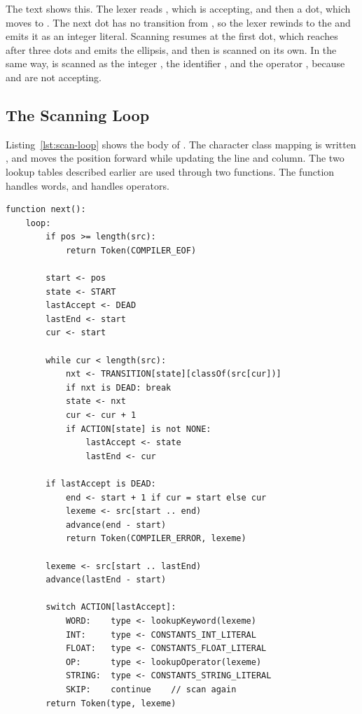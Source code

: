 The text  shows this. The lexer reads , which is accepting,
and then a dot, which moves to . The next dot has no transition
from , so the lexer rewinds to the  and emits it as an
integer literal. Scanning resumes at the first dot, which reaches
 after three dots and emits the ellipsis, and then  is
scanned on its own. In the same way,  is scanned as the integer
, the identifier , and the operator \code{+}, because
 and  are not accepting.

\subsection{The Scanning Loop}

Listing~\ref{lst:scan-loop} shows the body of . The character class
mapping is written , and  moves the position
forward while updating the line and column. The two lookup tables described
earlier are used through two functions. The function 
handles words, and  handles operators.

\begin{lstlisting}[style=pseudocode, float=tbp,
    caption={The scanning loop of the lexer.}, label=lst:scan-loop]
function next():
    loop:
        if pos >= length(src):
            return Token(COMPILER_EOF)

        start <- pos
        state <- START
        lastAccept <- DEAD
        lastEnd <- start
        cur <- start

        while cur < length(src):
            nxt <- TRANSITION[state][classOf(src[cur])]
            if nxt is DEAD: break
            state <- nxt
            cur <- cur + 1
            if ACTION[state] is not NONE:
                lastAccept <- state
                lastEnd <- cur

        if lastAccept is DEAD:
            end <- start + 1 if cur = start else cur
            lexeme <- src[start .. end)
            advance(end - start)
            return Token(COMPILER_ERROR, lexeme)

        lexeme <- src[start .. lastEnd)
        advance(lastEnd - start)

        switch ACTION[lastAccept]:
            WORD:    type <- lookupKeyword(lexeme)
            INT:     type <- CONSTANTS_INT_LITERAL
            FLOAT:   type <- CONSTANTS_FLOAT_LITERAL
            OP:      type <- lookupOperator(lexeme)
            STRING:  type <- CONSTANTS_STRING_LITERAL
            SKIP:    continue    // scan again
        return Token(type, lexeme)
\end{lstlisting}

